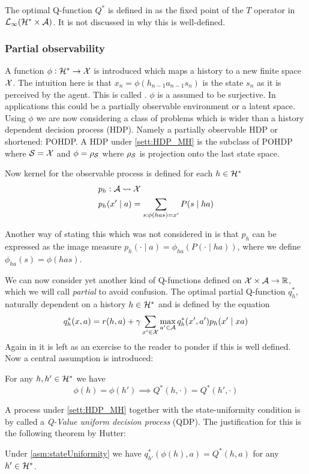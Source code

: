 The optimal Q-function $Q^*$ is defined in  as
the fixed point of the $T$ operator in
$\mathcal{L}_\infty(\mathcal{H}^* \times \mathcal{A})$.
It is not discussed in  why this is well-defined.

\subsubsection{Partial observability}

A function $\phi : \mathcal{H}^* \to \mathcal{X}$ is introduced
which maps a history to a new finite space $\mathcal{X}$.
The intuition here is that $x_n = \phi(h_{n-1} a_{n-1} s_n)$ is the
state $s_n$ as it is perceived by the agent.
This is called .
$\phi$ is a assumed to be surjective.
In applications this could be a partially observable environment
or a latent space.
Using $\phi$ we are now considering a class of problems
which is wider than a 
history dependent decision process (HDP).
Namely a partially observable HDP or shortened: POHDP.
A HDP under \cref{sett:HDP_MH} is the subclass of POHDP where
$\mathcal{S} = \mathcal{X}$ and $\phi = \rho_\mathcal{S}$ where $\rho_\mathcal{S}$ is projection
onto the last state space.

Now kernel for the observable process is defined for each $h \in \mathcal{H}^*$
\begin{align*} p_h & : \mathcal{A} \leadsto \mathcal{X}
  \\ p_h & (x' \mid a)
  = \sum_{s:\phi(has)=x'} P(s \mid ha)
\end{align*}
\begin{rem}
  Another way of stating this which was not considered in 
  is that $p_h$ can be expressed as the image measure
  $p_h(\cdot \mid a) = \phi_{ha}(P(\cdot \mid ha))$, where
  we define $\phi_{ha}(s) = \phi(has)$.
\end{rem}

We can now consider yet another kind of Q-functions defined
on $\mathcal{X} \times \mathcal{A} \to \mathbb{R}$, which we will call \emph{partial} to avoid
confusion. The optimal partial Q-function $q_h^*$,
naturally dependent on a history $h \in \mathcal{H}^*$ and is defined by the equation
\begin{equation}
  q_h^*(x, a) = r(h,a) + \gamma \sum_{x' \in \mathcal{X}} 
  \max_{a' \in \mathcal{A}} q^*_h(x', a') p_h(x' \mid xa)
  \label{eq:MH_q_def}
\end{equation}
Again in 
it is left as an exercise to the reader to ponder if this is well defined.
Now a central assumption is introduced:
\begin{asm}
  For any $h,h' \in \mathcal{H}^*$ we have
  \[ \phi(h) = \phi(h') \implies Q^*(h, \cdot) = Q^*(h', \cdot) \]
  \label{asm:stateUniformity}
\end{asm}
A process under \cref{sett:HDP_MH} together with the state-uniformity condition
is by  called a \emph{Q-Value uniform decision process} (QDP).
The justification for this is the following theorem by Hutter:
\begin{thm}[Hutter, 2016]
  Under \cref{asm:stateUniformity} we have
  $q^*_{h'}(\phi(h), a) = Q^*(h, a)$ for any $h'\in \mathcal{H}^*$.
\end{thm}

